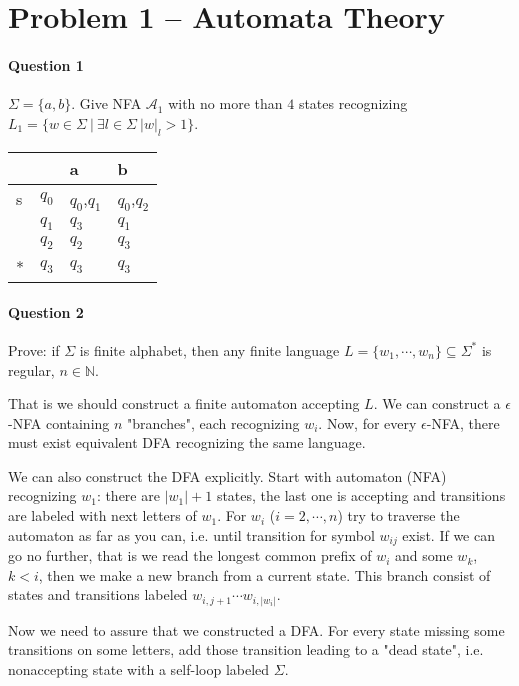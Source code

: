 \section{Problem 1 – Automata Theory}

\paragraph{Question 1}
$\Sigma = \{a,b\}$. 
Give NFA $\mathcal{A}_1$ with no more than $4$ states recognizing $L_1 = \{w\in \Sigma \:|\: \exists l\in \Sigma \: |w|_l > 1\}$.
\begin{table}[!h]
\centering
\begin{tabular}{ll||l|l}
  &    & a     & b     \\
  \hline
s & $q_0$ & $q_0$,$q_1$ & $q_0$,$q_2$ \\
  & $q_1$ & $q_3$    & $q_1$    \\
  & $q_2$ & $q_2$    & $q_3$    \\
* & $q_3$ & $q_3$    & $q_3$   
\end{tabular}
\end{table}


\paragraph{Question 2}
Prove: if $\Sigma$ is finite alphabet, then any finite language $L = \{w_1,\cdots,w_n\} \subseteq \Sigma^*$ is regular, $n\in \mathbb{N}$.

That is we should construct a finite automaton accepting $L$.
We can construct a $\epsilon$-NFA containing $n$ "branches", each recognizing $w_i$.
Now, for every $\epsilon$-NFA, there must exist equivalent DFA recognizing the same language.

We can also construct the DFA explicitly.
Start with automaton (NFA) recognizing $w_1$: there are $|w_1|+1$ states, the last one is accepting and transitions are labeled with next letters of $w_1$.
For $w_i$ ($i=2,\cdots,n$) try to traverse the automaton as far as you can, i.e. until transition for symbol $w_{ij}$ exist.
If we can go no further, that is we read the longest common prefix of $w_i$ and some $w_k$, $k<i$, then we make a new branch from a current state.
This branch consist of states and transitions labeled $w_{i,j+1}\cdots w_{i, |w_i|}$.

Now we need to assure that we constructed a DFA.
For every state missing some transitions on some letters, add those transition leading to a "dead state", i.e. nonaccepting state with a self-loop labeled $\Sigma$.


